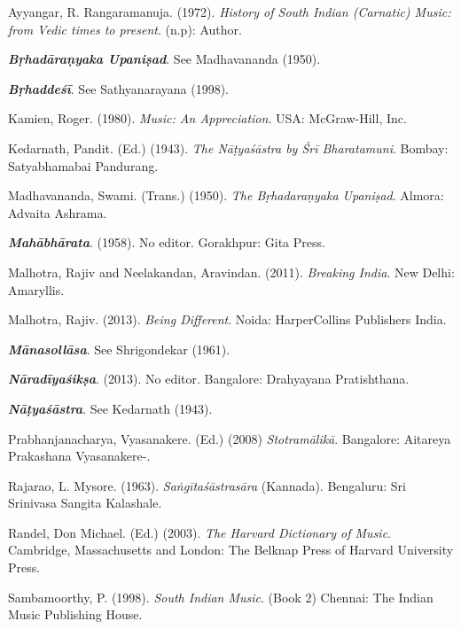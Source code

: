 \begin{thebibliography}{99}
\itemsep=0pt

  Ayyangar, R. Rangaramanuja. (1972). \textit{History of South Indian (Carnatic) Music: from Vedic times to present}. (n.p): Author.

  \textbf{\textit{Bṛhadāraṇyaka Upaniṣad}}. See Madhavananda (1950).

  \textbf{\textit{Bṛhaddeśī}}. See Sathyanarayana (1998).

  Kamien, Roger. (1980). \textit{Music: An Appreciation}. USA: McGraw-Hill, Inc.

  Kedarnath, Pandit. (Ed.) (1943). \textit{The Nāṭyaśāstra by Śrī Bharatamuni}. Bombay: Satyabhamabai Pandurang.

  Madhavananda, Swami. (Trans.) (1950). \textit{The Bṛhadaraṇyaka Upaniṣad}. Almora: Advaita Ashrama.

  \textbf{\textit{Mahābhārata}}. (1958). No editor. Gorakhpur: Gita Press.

  Malhotra, Rajiv and Neelakandan, Aravindan. (2011). \textit{Breaking India}. New Delhi: Amaryllis.

  Malhotra, Rajiv. (2013). \textit{Being Different}. Noida: HarperCollins Publishers India.

  \textbf{\textit{Mānasollāsa}}. See Shrigondekar (1961).

  \textbf{\textit{Nāradīyaśikṣa}}. (2013). No editor. Bangalore: Drahyayana Pratishthana.

  \textbf{\textit{Nāṭyaśāstra}}. See Kedarnath (1943).

  Prabhanjanacharya, Vyasanakere. (Ed.) (2008) \textit{Stotramālikā}. Bangalore: Aitareya Prakashana Vyasanakere-.

  Rajarao, L. Mysore. (1963). \textit{Saṅgītaśāstrasāra} (Kannada). Bengaluru: Sri Srinivasa Sangita Kalashale.

  Randel, Don Michael. (Ed.) (2003). \textit{The Harvard Dictionary of Music}. Cambridge, Massachusetts and London: The Belknap Press of Harvard University Press.

  Sambamoorthy, P. (1998). \textit{South Indian Music}. (Book 2) Chennai: The Indian Music Publishing House.


\end{thebibliography}
